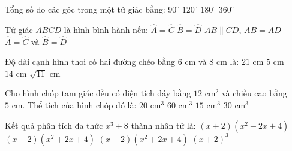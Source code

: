 \documentclass[12pt,a4paper]{article}
\begin{document}
\begin{ex}
Tổng số đo các góc trong một tứ giác bằng:
\choice
{$90^\circ$}
{$120^\circ$}
{$180^\circ$}
{\True $360^\circ$}
\end{ex}

\begin{ex}
Tứ giác $ABCD$ là hình bình hành nếu:
\choice
{$\widehat{A} = \widehat{C}$}
{$\widehat{B} = \widehat{D}$}
{$AB \parallel CD$, $AB = AD$}
{\True $\widehat{A} = \widehat{C}$ và $\widehat{B} = \widehat{D}$}
\end{ex}

\begin{ex}
Độ dài cạnh hình thoi có hai đường chéo bằng $6\text{ cm}$ và $8\text{ cm}$ là:
\choice
{$21\text{ cm}$}
{\True $5\text{ cm}$}
{$14\text{ cm}$}
{$\sqrt{11}\text{ cm}$}
\end{ex}

\begin{ex}
Cho hình chóp tam giác đều có diện tích đáy bằng $12\text{ cm}^2$ và chiều cao bằng $5\text{ cm}$. Thể tích của hình chóp đó là:
\choice
{\True $20\text{ cm}^3$}
{$60\text{ cm}^3$}
{$15\text{ cm}^3$}
{$30\text{ cm}^3$}
\end{ex}

\begin{ex}
Kết quả phân tích đa thức $x^3 + 8$ thành nhân tử là:
\choice
{\True $(x + 2)(x^2 - 2x + 4)$}
{$(x + 2)(x^2 + 2x + 4)$}
{$(x - 2)(x^2 + 2x + 4)$}
{$(x + 2)^3$}
\end{ex}
\end{document}
